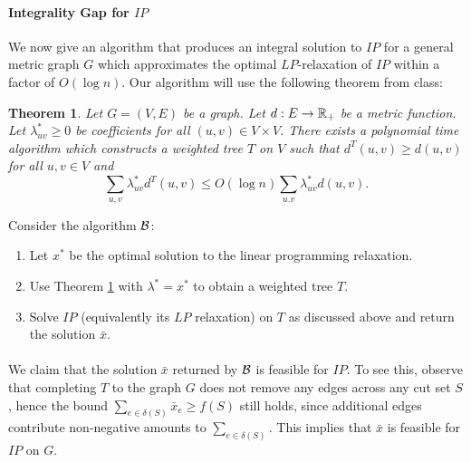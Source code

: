 \documentclass[letterpaper,12pt,oneside,onecolumn]{article}
\newtheorem{theorem}[fact]{Theorem}
\begin{document}
\paragraph{Integrality Gap for $IP$}
We now give an algorithm that produces an integral solution to $IP$ for a general metric graph $G$ which approximates the optimal $LP$-relaxation of $IP$ within a factor of $O(\log n)$. Our algorithm will use the following theorem from class:
\begin{theorem} \label{th:metric-tree}
Let $G=(V,E)$ be a graph. Let $d: E \rightarrow \mathbb{R}_+$ be a metric function. Let $\lambda^*_{uv} \geq 0$ be coefficients for all $(u,v) \in V\times V$. There exists a polynomial time algorithm which constructs a weighted tree $T$ on $V$ such that $d^T(u,v) \geq d(u,v)$ for all $u,v\in V$ and $$\sum_{u,v} \lambda^*_{uv}d^T(u,v) \leq O(\log n) \sum_{u.v} \lambda^*_{uv} d(u,v).$$
\end{theorem}
Consider the algorithm $\mathcal{B}$:
\begin{enumerate}
\item Let $x^*$ be the optimal solution to the linear programming relaxation.
\item Use Theorem \ref{th:metric-tree} with $\lambda^* = x^*$ to obtain a weighted tree $T$.
\item Solve $IP$ (equivalently its $LP$ relaxation) on $T$ as discussed above and return the solution $\bar{x}$.
\end{enumerate}
\paragraph{}
We claim that the solution $\bar{x}$ returned by $\mathcal{B}$ is feasible for $IP$. To see this, observe that completing $T$ to the graph $G$ does not remove any edges across any cut set $S$, hence the bound $\sum_{e \in \delta(S)} \bar{x}_e \geq f(S)$ still holds, since additional edges contribute non-negative amounts to $\sum_{e \in \delta(S)}$. This implies that $\bar{x}$ is feasible for $IP$ on $G$.
\end{document}
